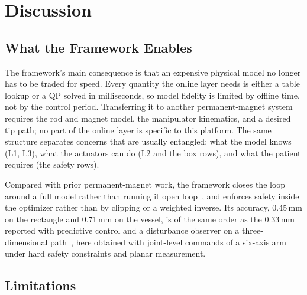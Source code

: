 \documentclass[journal]{IEEEtran}
\begin{document}
\section{Discussion}
\label{sec:discussion}

\subsection{What the Framework Enables}
\label{sec:disc-enable}

The framework's main consequence is that an expensive physical model no
longer has to be traded for speed. Every quantity the online layer needs
is either a table lookup or a QP solved in milliseconds, so model fidelity
is limited by offline time, not by the control period. Transferring it to
another permanent-magnet system requires the rod and magnet model, the
manipulator kinematics, and a desired tip path; no part of the online
layer is specific to this platform. The same structure separates concerns
that are usually entangled: what the model knows (L1, L3), what the
actuators can do (L2 and the box rows), and what the patient requires (the
safety rows).

Compared with prior permanent-magnet work, the framework closes the loop
around a full model rather than running it open
loop~\cite{kratchman2017guiding}, and enforces safety inside the optimizer
rather than by clipping or a weighted inverse. Its accuracy, 0.45\,mm on the rectangle and 0.71\,mm on the vessel, is of
the same order as the 0.33\,mm reported with predictive control and a
disturbance observer on a three-dimensional path~\cite{pratt2023observed},
here obtained with joint-level commands of a six-axis arm under hard
safety constraints and planar measurement.

\subsection{Limitations}
\label{sec:limitations}
\end{document}
